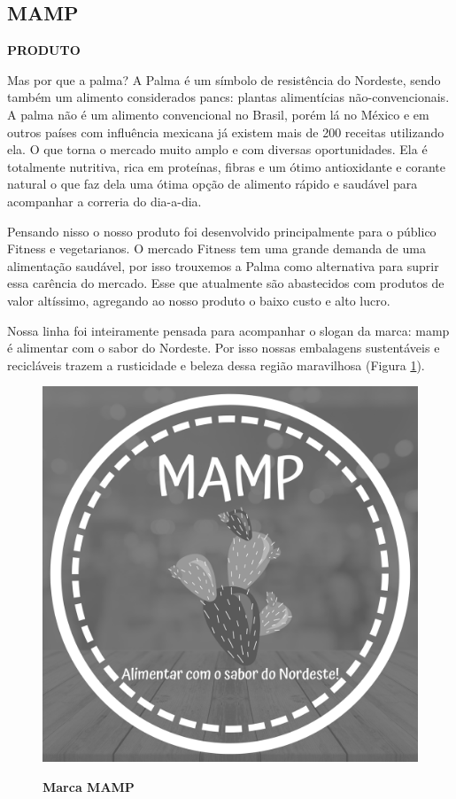 \subsection{MAMP}

\textbf{PRODUTO}

Mas por que a palma? A Palma é um símbolo de resistência do Nordeste, sendo também um alimento considerados pancs: plantas alimentícias não-convencionais. A palma não é um alimento convencional no Brasil, porém lá no México e em outros países com influência mexicana já existem mais de 200 receitas utilizando ela. O que torna o mercado muito amplo e com diversas oportunidades. Ela é totalmente nutritiva, rica em proteínas, fibras e um ótimo antioxidante e corante natural o que faz dela uma ótima opção de alimento rápido e saudável para acompanhar a correria do dia-a-dia.

Pensando nisso o nosso produto foi desenvolvido principalmente para o público Fitness e vegetarianos. O mercado Fitness tem uma grande demanda de uma alimentação saudável, por isso trouxemos a Palma como alternativa para suprir essa carência do mercado. Esse que atualmente são abastecidos com produtos de valor altíssimo, agregando ao nosso produto o baixo custo e alto lucro.

Nossa linha foi inteiramente pensada para acompanhar o slogan da marca: mamp é alimentar com o sabor do Nordeste. Por isso nossas embalagens sustentáveis e recicláveis trazem a rusticidade e beleza dessa região maravilhosa (Figura \ref{figura_22}).



\begin{figure}[H]
\centering
\caption{\textbf{Marca MAMP}}
\includegraphics[scale=0.1]{Imagens/mamp.png}
\label{figura_22}
\end{figure}



